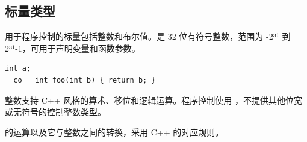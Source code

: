 \subsection*{标量类型}

用于程序控制的标量包括整数和布尔值。\co@int@ 是 32 位有符号整数，范围为 -2³¹ 到 2³¹-1，可用于声明变量和函数参数。

\begin{lstlisting}[language=croqtile,caption={标量类型}]
int a;
__co__ int foo(int b) { return b; }
\end{lstlisting}

整数支持 C++ 风格的算术、移位和逻辑运算。程序控制使用 \co@int@，不提供其他位宽或无符号的控制整数类型。

\co@bool@ 的运算以及它与整数之间的转换，采用 C++ 的对应规则。
